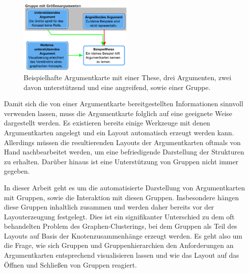 \begin{figure}[h]
\begin{center}
	\includegraphics[width=0.5\textwidth]{Pics/Beispielargumentkarte.png}
	\caption{Beispielhafte Argumentkarte mit einer These, drei Argumenten, zwei davon unterstützend und eine angreifend, sowie einer Gruppe.}
	\label{f:Beispielargumentkarte}
\end{center}
\end{figure}

Damit sich die von einer Argumentkarte bereitgestellten Informationen sinnvoll verwenden lassen, muss die Argumentkarte folglich auf eine geeignete Weise dargestellt werden.
Es existieren bereits einige Werkzeuge mit denen Argumentkarten angelegt  und ein Layout automatisch erzeugt werden kann. 
Allerdings müssen die resultierenden Layouts der Argumentkarten oftmals von Hand nachbearbeitet werden, um eine befriedigende Darstellung der Strukturen zu erhalten.
Darüber hinaus ist eine Unterstützung von Gruppen nicht immer gegeben.

In dieser Arbeit geht es um die automatisierte Darstellung von Argumentkarten mit Gruppen, sowie die Interaktion mit diesen Gruppen. Insbesondere hängen diese Gruppen inhaltlich zusammen und werden daher bereits vor der Layouterzeugung festgelegt. Dies ist ein signifikanter Unterschied zu dem oft behandelten Problem des Graphen-Clusterings, bei dem Gruppen als Teil des Layouts auf Basis der Knotenzusammenhänge erzeugt werden.
Es geht also um die Frage, wie sich Gruppen und Gruppenhierarchien den Anforderungen an Argumentkarten entsprechend visualisieren lassen 
und wie das Layout auf das Öffnen und Schließen von Gruppen reagiert.

